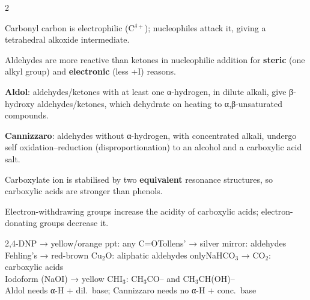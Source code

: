 \documentclass[10pt,a4paper]{extarticle}
\begin{document}
\begin{multicols}{2}
\begin{fl}
\item Carbonyl carbon is electrophilic (C$^{\delta+}$); nucleophiles attack it, giving a tetrahedral alkoxide intermediate.
\item Aldehydes are more reactive than ketones in nucleophilic addition for \textbf{steric} (one alkyl group) and \textbf{electronic} (less +I) reasons.
\item \textbf{Aldol}: aldehydes/ketones with at least one α-hydrogen, in dilute alkali, give β-hydroxy aldehydes/ketones, which dehydrate on heating to α,β-unsaturated compounds.
\item \textbf{Cannizzaro}: aldehydes without α-hydrogen, with concentrated alkali, undergo self oxidation--reduction (disproportionation) to an alcohol and a carboxylic acid salt.
\item Carboxylate ion is stabilised by two \textbf{equivalent} resonance structures, so carboxylic acids are stronger than phenols.
\item Electron-withdrawing groups increase the acidity of carboxylic acids; electron-donating groups decrease it.
\end{fl}

\begin{kbox}
2,4-DNP → yellow/orange ppt: any C=O\quad Tollens' → silver mirror: aldehydes\\
Fehling's → red-brown Cu$_2$O: aliphatic aldehydes only\quad NaHCO$_3$ → CO$_2$: carboxylic acids\\
Iodoform (NaOI) → yellow CHI$_3$: CH$_3$CO-- and CH$_3$CH(OH)--\\
Aldol needs α-H + dil.\ base; Cannizzaro needs no α-H + conc.\ base
\end{kbox}


\end{multicols}
\end{document}
